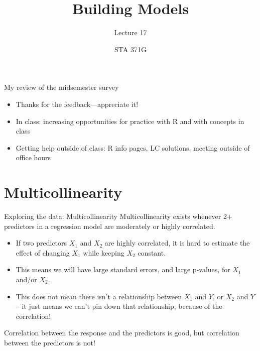 \documentclass{beamer}\usepackage[]{graphicx}\usepackage[]{color}
\title{Building Models}
\subtitle{Lecture 17}
\author{STA 371G}
\begin{document}
  

  \frame{\maketitle}



  \begin{darkframes}
    \begin{frame}{My review of the midsemester survey}
      \begin{itemize}[<+->]
        \item Thanks for the feedback---appreciate it!
        \item In class: increasing opportunities for practice with R and with concepts in class
        \item Getting help outside of class: R info pages, LC solutions, meeting outside of office hours
      \end{itemize}
    \end{frame}

    \section{Multicollinearity}

    \begin{frame}[fragile]{Exploring the data: Multicollinearity}
      Multicollinearity exists whenever 2+ predictors in a regression model are moderately or highly correlated. \pause
      \begin{itemize}[<+->]
        \item If two predictors $X_1$ and $X_2$ are highly correlated, it is hard to estimate the effect of changing $X_1$ while keeping $X_2$ constant.
        \item This means we will have large standard errors, and large p-values, for $X_1$ and/or $X_2$.
        \item This \alert{does not} mean there isn't a relationship between $X_1$ and $Y$, or $X_2$ and $Y$ -- it just means we can't pin down that relationship, because of the correlation!
      \end{itemize}
      \pause
      Correlation between the response and the predictors is good, but correlation between the predictors is not!
    \end{frame}


\end{darkframes}
\end{document}
